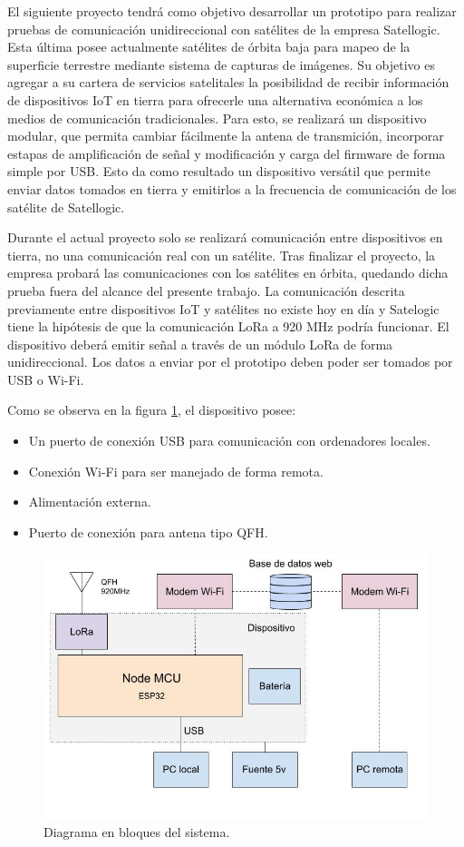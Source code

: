 \documentclass[
11pt, %
codirector, %
]{charter}
\begin{document}
El siguiente proyecto tendrá como objetivo desarrollar un prototipo para realizar pruebas de comunicación unidireccional con satélites de la empresa Satellogic. Esta última posee actualmente satélites de órbita baja para mapeo de la superficie terrestre mediante sistema de capturas de imágenes. Su objetivo es agregar a su cartera de servicios satelitales la posibilidad de recibir información de dispositivos IoT en tierra para ofrecerle una alternativa económica a los medios de comunicación tradicionales. Para esto, se realizará un dispositivo modular, que permita cambiar fácilmente la antena de transmición, incorporar estapas de amplificación de señal y modificación y carga del firmware de forma simple por USB. Esto da como resultado un dispositivo versátil que permite enviar datos tomados en tierra y emitirlos a la frecuencia de comunicación de los satélite de Satellogic.

Durante el actual proyecto solo se realizará comunicación entre dispositivos en tierra, no una comunicación real con un satélite. Tras finalizar el proyecto, la empresa probará las comunicaciones con los satélites en órbita, quedando dicha prueba fuera del alcance del presente trabajo. La comunicación descrita previamente entre dispositivos IoT y satélites no existe hoy en día y Satelogic tiene la hipótesis de que la comunicación LoRa a 920 MHz podría funcionar.
El dispositivo deberá emitir señal a través de un módulo LoRa de forma unidireccional. Los datos a enviar por el prototipo deben poder ser tomados por USB o Wi-Fi.


Como se observa en la figura \ref{fig:diagBloques}, el dispositivo posee:
\begin{itemize}
	\item Un puerto de conexión USB para comunicación con ordenadores locales.
	\item Conexión Wi-Fi para ser manejado de forma remota.
	\item Alimentación externa.
	\item Puerto de conexión para antena tipo QFH.
\end{itemize}

\begin{figure}[htpb]
\centering 
\includegraphics[width=.8\textwidth]{./Figuras/Diagrama de bloques.jpg}
\caption{Diagrama en bloques del sistema.}
\label{fig:diagBloques}
\end{figure}
\end{document}
